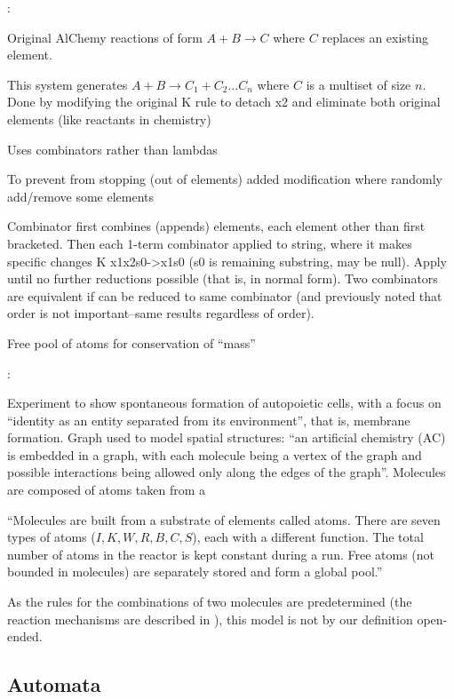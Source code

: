 \begin{NOTES}
\parencite{Fenizio2000}:

Original AlChemy reactions of form $A+B\rightarrow C$ where $C$ replaces an existing element.

This system generates $A+B\rightarrow C_1+C_2...C_n$ where $C$ is a multiset of size $n$. Done by modifying the original K rule to detach x2 and eliminate both original elements (like reactants in chemistry)

Uses combinators rather than lambdas

To prevent from stopping (out of elements) added modification where randomly add/remove some elements

Combinator first combines (appends) elements, each element other than first bracketed. Then each 1-term combinator applied to string, where it makes specific changes \eg K x1x2s0-\textgreater{}x1s0 (s0 is remaining substring, may be null). Apply until no further reductions possible (that is, in normal form). Two combinators are equivalent if can be reduced to same combinator (and previously noted that order is not important--same results regardless of order).

Free pool of atoms for conservation of ``mass''

\parencite{Fenizio2001}:

Experiment to show spontaneous formation of autopoietic cells, with a focus on ``identity as an entity separated from its environment'', that is, membrane formation. Graph used to model spatial structures: ``an artificial chemistry (AC) is embedded in a graph, with each molecule being a vertex of the graph and possible interactions being allowed only along the edges of the graph''. Molecules are composed of atoms taken from a 

``Molecules are built from a substrate of elements called atoms. There are seven types of atoms ($I, K, W, R, B, C, S$), each with a different function. The total number of atoms in the reactor is kept constant during a run. Free atoms (not bounded in molecules) are separately stored and form a global pool.''

As the rules for the combinations of two molecules are predetermined (the reaction mechanisms are described in \cite{Fenizio2000}), this model is not by our definition open-ended.
\end{NOTES}
\subsection{Automata}

